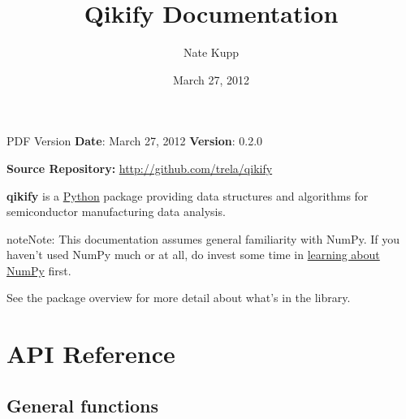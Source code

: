 \documentclass[letterpaper,10pt,english]{sphinxmanual}
\title{Qikify Documentation}
\date{March 27, 2012}
\author{Nate Kupp}
\begin{document}
\maketitle
\tableofcontents
{}\label{index::doc}


PDF Version
\label{index:module-qikify}
\textbf{Date}: March 27, 2012 \textbf{Version}: 0.2.0

\textbf{Source Repository:} \href{http://github.com/trela/qikify}{http://github.com/trela/qikify}

\textbf{qikify} is a \href{http://www.python.org}{Python} package providing data
structures and algorithms for semiconductor manufacturing data analysis.

\begin{notice}{note}{Note:}
This documentation assumes general familiarity with NumPy. If you haven't
used NumPy much or at all, do invest some time in \href{http://docs.scipy.org}{learning about NumPy} first.
\end{notice}

See the package overview for more detail about what's in the library.


\chapter{API Reference}
\label{api:api-reference}\label{api:api}\label{api::doc}\label{api:qikify-machine-learning}

\section{General functions}
\label{api:api-functions}\label{api:general-functions}
\end{document}

